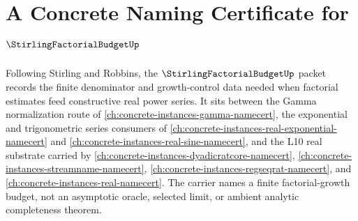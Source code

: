 \chapter{A Concrete Naming Certificate for $\StirlingFactorialBudgetUp$}
\label{ch:concrete-instances-stirling-factorial-budget-namecert}

Following Stirling and Robbins, the $\StirlingFactorialBudgetUp$ packet records the finite denominator and growth-control data needed when factorial estimates feed constructive real power series. It sits between the Gamma normalization route of \autoref{ch:concrete-instances-gamma-namecert}, the exponential and trigonometric series consumers of \autoref{ch:concrete-instances-real-exponential-namecert} and \autoref{ch:concrete-instances-real-sine-namecert}, and the L10 real substrate carried by \autoref{ch:concrete-instances-dyadicratcore-namecert}, \autoref{ch:concrete-instances-streamname-namecert}, \autoref{ch:concrete-instances-regseqrat-namecert}, and \autoref{ch:concrete-instances-real-namecert}. The carrier names a finite factorial-growth budget, not an asymptotic oracle, selected limit, or ambient analytic completeness theorem.

